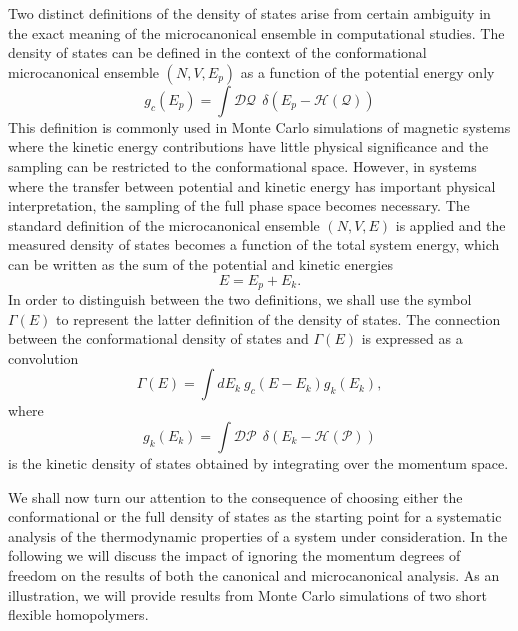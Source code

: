 \documentclass[12pt]{report}
\begin{document}
Two distinct definitions of the density of states arise from certain ambiguity in the exact meaning of the microcanonical ensemble in computational studies. The density of states can be defined in the context of the conformational microcanonical ensemble $(N,V,E_{p})$ as a function of the potential energy only
\begin{equation}
g_{c}(E_{p}) = \int \mathcal{DQ} \:\: \delta(E_{p} - \mathcal{H}(\mathcal{Q}))
\end{equation}
This definition is commonly used in Monte Carlo simulations of magnetic systems where the kinetic energy contributions have little physical significance and the sampling can be restricted to the conformational space. However, in systems where the transfer between potential and kinetic energy has important physical interpretation, the sampling of the full phase space becomes necessary. The standard definition of the microcanonical ensemble $(N,V,E)$ is applied and the measured density of states becomes a function of the total system energy, which can be written as the sum of the potential and kinetic energies
\begin{equation}
E = E_{p} + E_{k}.
\end{equation}
In order to distinguish between the two definitions, we shall use the symbol $\Gamma(E)$ to represent the latter definition of the density of states. The connection between the conformational density of states and $\Gamma(E)$ is expressed as a convolution\cite{Calvo1995}
\begin{equation}
\label{eq:TotalDOS}
\Gamma(E) = \int dE_{k} \: g_{c}(E - E_{k})g_{k}(E_{k}),
\end{equation}
where 
\begin{equation}
g_{k}(E_{k}) = \int \mathcal{DP} \:\: \delta(E_{k} - \mathcal{H}(\mathcal{P}))
\end{equation}
is the kinetic density of states obtained by integrating over the momentum space.

We shall now turn our attention to the consequence of choosing either the conformational or the full density of states as the starting point for a systematic analysis of the thermodynamic properties of a system under consideration. In the following we will discuss the impact of ignoring the momentum degrees of freedom on the results of both the canonical and microcanonical analysis. As an illustration, we will provide results from Monte Carlo simulations of two short flexible homopolymers.
\end{document}
